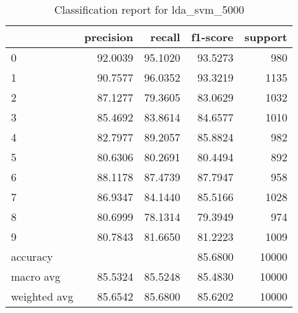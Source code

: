 \begin{table}[htb!]
\centering
\begin{tabular}{lrrrr}
    \toprule
    & precision & recall & f1-score & support \\
    \midrule
    0 & 92.0039 & 95.1020 & 93.5273 & 980 \\
    1 & 90.7577 & 96.0352 & 93.3219 & 1135 \\
    2 & 87.1277 & 79.3605 & 83.0629 & 1032 \\
    3 & 85.4692 & 83.8614 & 84.6577 & 1010 \\
    4 & 82.7977 & 89.2057 & 85.8824 & 982 \\
    5 & 80.6306 & 80.2691 & 80.4494 & 892 \\
    6 & 88.1178 & 87.4739 & 87.7947 & 958 \\
    7 & 86.9347 & 84.1440 & 85.5166 & 1028 \\
    8 & 80.6999 & 78.1314 & 79.3949 & 974 \\
    9 & 80.7843 & 81.6650 & 81.2223 & 1009 \\
    accuracy & & & 85.6800 & 10000 \\
    macro avg & 85.5324 & 85.5248 & 85.4830 & 10000 \\
    weighted avg & 85.6542 & 85.6800 & 85.6202 & 10000 \\
    \bottomrule
\end{tabular}
\caption{Classification report for lda_svm_5000}
\label{tab:classification-report-lda_svm_5000}
\end{table}
